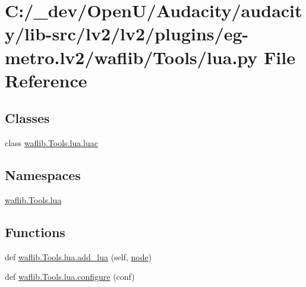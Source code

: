 \hypertarget{lv2_2plugins_2eg-metro_8lv2_2waflib_2_tools_2lua_8py}{}\section{C\+:/\+\_\+dev/\+Open\+U/\+Audacity/audacity/lib-\/src/lv2/lv2/plugins/eg-\/metro.lv2/waflib/\+Tools/lua.py File Reference}
\label{lv2_2plugins_2eg-metro_8lv2_2waflib_2_tools_2lua_8py}
\subsection*{Classes}
\begin{DoxyCompactItemize}
\item 
class \hyperlink{classwaflib_1_1_tools_1_1lua_1_1luac}{waflib.\+Tools.\+lua.\+luac}
\end{DoxyCompactItemize}
\subsection*{Namespaces}
\begin{DoxyCompactItemize}
\item 
 \hyperlink{namespacewaflib_1_1_tools_1_1lua}{waflib.\+Tools.\+lua}
\end{DoxyCompactItemize}
\subsection*{Functions}
\begin{DoxyCompactItemize}
\item 
def \hyperlink{namespacewaflib_1_1_tools_1_1lua_a68e603a9eb9ca00ea36ac02d5fd4e360}{waflib.\+Tools.\+lua.\+add\+\_\+lua} (self, \hyperlink{structnode}{node})
\item 
def \hyperlink{namespacewaflib_1_1_tools_1_1lua_a5419673a215f8866f529e47be9f846e5}{waflib.\+Tools.\+lua.\+configure} (conf)
\end{DoxyCompactItemize}
